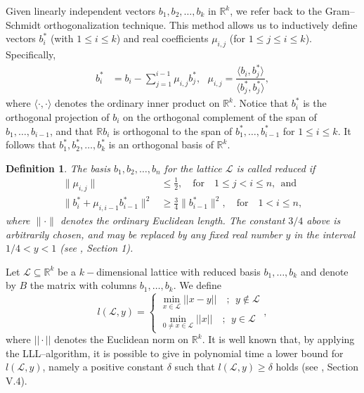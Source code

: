 \documentclass[11pt,a4paper]{article}
\newtheorem{definition}[theorem]{Definition}
\numberwithin{equation}{section}
\numberwithin{table}{section}
\numberwithin{figure}{section}
\begin{document}
Given linearly independent vectors $b_1, b_2, \ldots, b_k $ in $ \mathbb{R}^k$, we refer back to the Gram--Schmidt orthogonalization technique. This method allows us to inductively define vectors $b^*_i$ (with $1 \leq i \leq k$) and real coefficients $\mu_{i,j}$ (for $1 \leq j \leq i \leq k$). Specifically,
\begin{align*}
	b^*_i &= b_i - \sum_{j=1}^{i-1} \mu_{i,j} b^*_j,~~~
	\mu_{i,j} = \dfrac{\langle b_i, b^*_j\rangle }{\langle b^*_j, b^*_j\rangle},
\end{align*}
where \( \langle \cdot , \cdot \rangle \)  denotes the ordinary inner product on \( \mathbb{R}^k \). Notice that \( b^*_i \) is the orthogonal projection of \( b_i \) on the orthogonal complement of the span of \( b_1, \ldots, b_{i-1} \), and that \( \mathbb{R}b_i \) is orthogonal to the span of \( b^*_1, \ldots, b^*_{i-1} \) for \( 1 \leq i \leq k \). It follows that \( b^*_1, b^*_2, \ldots, b^*_k \) is an orthogonal basis of \( \mathbb{R}^k \). 
\begin{definition}
	The basis $b_1, b_2, \ldots, b_n$ for the lattice $\mathcal{L}$ is called reduced if
	\begin{align*}
		\| \mu_{i,j} \| &\leq \frac{1}{2}, \quad \text{for} \quad 1 \leq j < i \leq n,~~
		\text{and}\\
		\|b^*_{i}+\mu_{i,i-1} b^*_{i-1}\|^2 &\geq \frac{3}{4}\|b^*_{i-1}\|^2, \quad \text{for} \quad 1 < i \leq n,
	\end{align*}
	where $ \| \cdot \| $ denotes the ordinary Euclidean length. The constant $ {3}/{4}$ above is arbitrarily chosen, and may be replaced by any fixed real number $ y $ in the interval ${1}/{4} < y < 1$ {\rm(see \cite{LLL}, Section 1)}.
\end{definition}
Let $\mathcal{L}\subseteq\mathbb{R}^k$ be a $k-$dimensional lattice  with reduced basis $b_1,\ldots,b_k$ and denote by $B$ the matrix with columns $b_1,\ldots,b_k$. 
We define
\[
l\left( \mathcal{L},y\right)= \left\{ \begin{array}{c}
	\min_{x\in \mathcal{L}}||x-y|| \quad  ;~~ y\not\in \mathcal{L}\\
	\min_{0\ne x\in \mathcal{L}}||x|| \quad  ;~~ y\in \mathcal{L}
\end{array}
\right.,
\]
where $||\cdot||$ denotes the Euclidean norm on $\mathbb{R}^k$. It is well known that, by applying the
LLL--algorithm, it is possible to give in polynomial time a lower bound for $l\left( \mathcal{L},y\right)$, namely a positive constant $\delta$ such that $l\left(\mathcal{L},y\right)\ge \delta$ holds (see \cite{SMA}, Section V.4).
\end{document}
